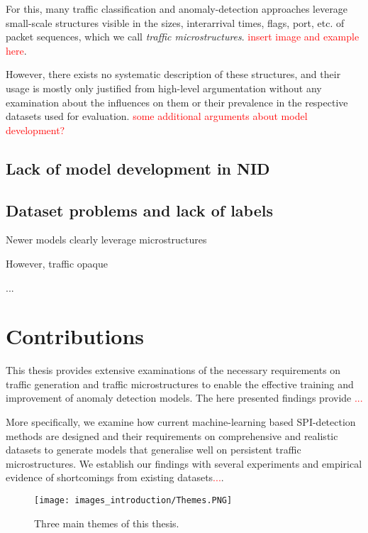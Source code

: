 For this, many traffic classification and anomaly-detection approaches leverage small-scale structures visible in the sizes, interarrival times, flags, port, etc. of packet sequences, which we call \emph{traffic microstructures}. \textcolor{red}{insert image and example here}. 

However, there exists no systematic description of these structures, and their usage is mostly only justified from high-level argumentation without any examination about the influences on them or their prevalence in the respective datasets used for evaluation. \textcolor{red}{some additional arguments about model development?}


\subsection{Lack of model development in NID}


\subsection{Dataset problems and lack of labels}




Newer models clearly leverage microstructures

However, traffic opaque 

...

\section{Contributions}

This thesis provides extensive examinations of the necessary requirements on traffic generation and traffic microstructures to enable the effective training and improvement of anomaly detection models. The here presented findings provide \textcolor{red}{...}

More specifically, we examine how current machine-learning based SPI-detection methods are designed and their requirements on comprehensive and realistic datasets to generate models that generalise well on persistent traffic microstructures. We establish our findings with several experiments and empirical evidence of shortcomings from existing datasets\textcolor{red}{...}.

\begin{figure}
\centering
\texttt{[image: images\_introduction/Themes.PNG]}
\caption{Three main themes of this thesis.}\label{Fig:themes}
\end{figure}

